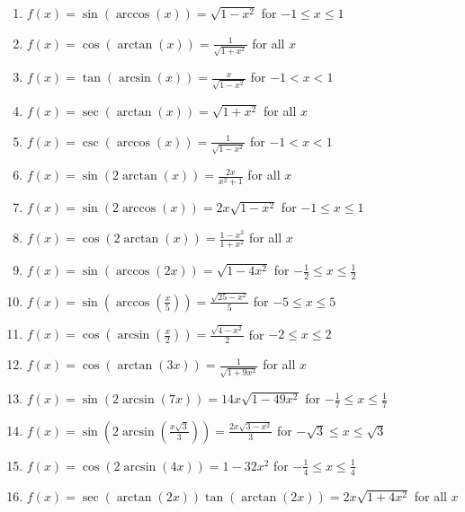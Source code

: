 \documentclass{ximera}
\begin{document}
\begin{enumerate}

\setcounter{enumi}{\value{HW}}

\item $f(x) = \sin \left( \arccos \left( x \right) \right) = \sqrt{1 - x^{2}}$  for $-1 \leq x \leq 1$
\item $f(x) = \cos \left( \arctan \left( x \right) \right) = \frac{1}{\sqrt{1 + x^{2}}}$ for all $x$
\item $f(x) =\tan \left( \arcsin \left( x \right) \right) = \frac{x}{\sqrt{1 - x^{2}}}$  for $-1 < x < 1$
\item $f(x) =\sec \left( \arctan \left( x \right) \right) = \sqrt{1 + x^{2}}$ for all $x$
\item $f(x) =\csc \left( \arccos \left( x \right) \right) = \frac{1}{\sqrt{1 - x^{2}}}$ for $-1 < x < 1$
\item $f(x) =\sin \left( 2\arctan \left( x \right) \right) = \frac{2x}{x^{2} + 1}$ for all $x$
\item $f(x) =\sin \left( 2\arccos \left( x \right) \right) = 2x\sqrt{1-x^2}$  for $-1 \leq x \leq 1$
\item $f(x) =\cos \left( 2\arctan \left( x \right) \right) = \frac{1 - x^{2}}{1 + x^{2}}$ for all $x$
\item  $f(x) =\sin(\arccos(2x)) = \sqrt{1-4x^2}$ for $-\frac{1}{2} \leq x \leq \frac{1}{2}$
\item  $f(x) =\sin\left(\arccos\left(\frac{x}{5}\right)\right) = \frac{\sqrt{25-x^2}}{5}$ for $-5 \leq x \leq 5$
\item  $f(x) =\cos\left(\arcsin\left(\frac{x}{2}\right)\right) = \frac{\sqrt{4-x^2}}{2}$ for $-2 \leq x \leq 2$
\item  $f(x) =\cos\left(\arctan\left(3x\right)\right) = \frac{1}{\sqrt{1+9x^{2}}}$ for all $x$
\item  $f(x) =\sin(2\arcsin(7x)) = 14x \sqrt{1-49x^2}$ for $-\frac{1}{7} \leq x \leq \frac{1}{7}$
\item  $f(x) =\sin\left(2 \arcsin\left( \frac{x\sqrt{3}}{3} \right) \right) = \frac{2x\sqrt{3-x^2}}{3}$ for $-\sqrt{3} \leq x \leq \sqrt{3}$
\item  $f(x) =\cos(2 \arcsin(4x)) = 1 - 32x^2$ for $-\frac{1}{4} \leq x \leq \frac{1}{4}$
\item  $f(x) =\sec(\arctan(2x))\tan(\arctan(2x)) = 2x \sqrt{1+4x^2}$ for all $x$



\end{enumerate}
\end{document}
